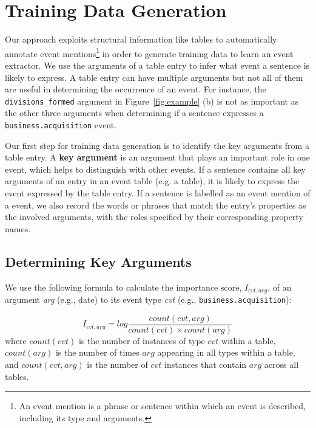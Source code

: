 \section{Training Data Generation}
Our approach exploits structural information like \FB \CVT tables to  automatically annotate event mentions\footnote{An event mention is a
phrase or sentence within which an event is described, including its type and arguments.} in order to generate training data to learn an
event extractor. We use the arguments of a \CVT table entry to infer what event a sentence is likely to express. A \CVT table entry can
have multiple arguments but not all of them are useful in determining the occurrence of an event. For instance, the
\texttt{divisions\_formed} argument in Figure~\ref{fig:example} (b) is not as important as the other three arguments when determining if a
sentence expresses a \texttt{business.acquisition} event.


Our first step for training data generation is to identify the key arguments from a \CVT table entry. A \textbf{key argument} is an
argument that plays an important role in one event, which helps to distinguish with other events. If a sentence contains all key arguments
of an entry in an event table (e.g. a \CVT table), it is likely to express the event expressed by the table entry. If a sentence is
labelled as an event mention of a \CVT event, we also record the words or phrases that match the entry's properties as the involved
arguments, with the roles specified by their corresponding property names.


\subsection{Determining Key Arguments}
We use the following formula to calculate the importance score, $I_{cvt, arg}$, of an argument \emph{arg} (e.g., date) to its event type
\emph{cvt} (e.g., \texttt{business.acquisition}):

\begin{equation}
	I_{cvt, arg} = log \frac{count(cvt, arg)}{count(cvt) \times count(arg)}
\end{equation}
%
where $count(cvt)$ is the number of instances of type $cvt$ within a \CVT table, $count(arg)$ is the number of times $arg$ appearing in all
\CVT types within a \CVT table, and $count(cvt, arg)$ is the number of $cvt$ instances that contain $arg$ across all \CVT tables.


